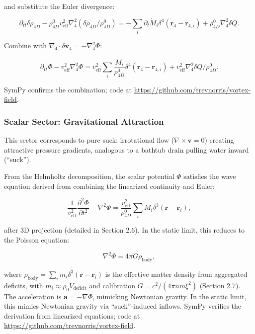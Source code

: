 and substitute the Euler divergence:

\begin{equation}
\partial_{tt} \delta \rho_{4D} - \rho_{4D}^0 v_{\text{eff}}^2 \nabla_4^2 (\delta \rho_{4D} / \rho_{4D}^0) = -\sum_i \partial_t \dot{M}_i \delta^4(\mathbf{r}_4 - \mathbf{r}_{4,i}) + \rho_{4D}^0 \nabla_4^2 \delta Q.
\end{equation}

Combine with $\nabla_4 \cdot \delta \mathbf{v}_4 = -\nabla_4^2 \Phi$:

\begin{equation}
\partial_{tt} \Phi - v_{\text{eff}}^2 \nabla_4^2 \Phi = v_{\text{eff}}^2 \sum_i \frac{\dot{M}_i}{\rho_{4D}^0} \delta^4(\mathbf{r}_4 - \mathbf{r}_{4,i}) + v_{\text{eff}}^2 \nabla_4^2 \delta Q / \rho_{4D}^0.
\end{equation}

SymPy confirms the combination; code at \url{https://github.com/trevnorris/vortex-field}.

\subsubsection{Scalar Sector: Gravitational Attraction}

This sector corresponds to pure suck: irrotational flow ($\nabla \times \mathbf{v} = 0$) creating attractive pressure gradients, analogous to a bathtub drain pulling water inward (``suck'').

From the Helmholtz decomposition, the scalar potential $\Phi$ satisfies the wave equation derived from combining the linearized continuity and Euler:

\begin{equation}
\frac{1}{v_{\text{eff}}^2} \frac{\partial^2 \Phi}{\partial t^2} - \nabla^2 \Phi = \frac{v_{\text{eff}}^2}{\rho_{4D}^0} \sum_i \dot{M}_i \delta^3(\mathbf{r} - \mathbf{r}_i),
\end{equation}

after 3D projection (detailed in Section 2.6). In the static limit, this reduces to the Poisson equation:

\begin{equation}
\nabla^2 \Phi = 4\pi G \rho_{\text{body}},
\end{equation}

where $\rho_{\text{body}} = \sum_i m_i \delta^3(\mathbf{r} - \mathbf{r}_i)$ is the effective matter density from aggregated deficits, with $m_i \approx \rho_0 V_{\text{deficit}}$ and calibration $G = c^2 / (4\pi \bar{n} \bar{m} \xi^2)$ (Section 2.7). The acceleration is $\mathbf{a} = -\nabla \Phi$, mimicking Newtonian gravity. In the static limit, this mimics Newtonian gravity via ``suck''-induced inflows. SymPy verifies the derivation from linearized equations; code at \url{https://github.com/trevnorris/vortex-field}.

